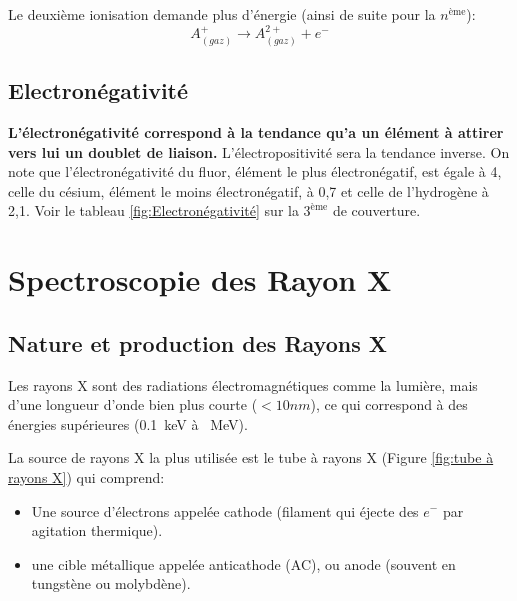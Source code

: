 \documentclass{article}
\begin{document}
Le deuxième ionisation demande plus d'énergie (ainsi de suite pour la $n^{\text{ème}}$): 
$$A^{+}_{(gaz)} \rightarrow A^{2+}_{(gaz)} + e^-$$

\vspace{1mm}
\hspace{0cm}\pgfPT[
    Z list=spd,
    CS all=darkgray,    
    csSoft,
    cell size=22pt, 
    show title=false, 
    show legend,
    show legend pins=false,
    name font=\Tiny,
    show periodic variations,
    cell style=pgfPTEi,
    varEi font=\footnotesize,    
    varR font=\footnotesize,
    varEi color=purple!50!white,
    Ei color=purple
    ]


\subsection{Electronégativité} \label{sous-section:Electronégativité}

\textbf{L'électronégativité correspond à la tendance qu'a un élément à attirer vers lui un doublet de liaison.} L'électropositivité sera la tendance inverse.
On note que l'électronégativité du fluor, élément le plus électronégatif, est égale à 4, celle 
du césium, élément le moins électronégatif, à 0,7 et celle de l'hydrogène à 2,1.
Voir le tableau \ref{fig:Electronégativité} sur la $3^{\text{ème}}$ de couverture.




\newpage

\section{Spectroscopie des Rayon X}

\subsection{Nature et production des Rayons X}

Les rayons X sont des radiations électromagnétiques comme la lumière, mais d'une 
longueur d'onde bien plus courte ($<10 nm$), ce qui correspond à des 
énergies supérieures (\qty{0.1}{keV} à \qty{}{MeV}).

La source de rayons X la plus utilisée est le tube à rayons X (Figure \ref{fig:tube à rayons X}) qui comprend:

\begin{itemize}[label=$\ast$]
    \item Une source d'électrons appelée cathode (filament qui éjecte des $e^-$ par agitation thermique).
    \item une cible métallique appelée anticathode (AC), ou anode (souvent en tungstène ou molybdène).
\end{itemize}
\end{document}
